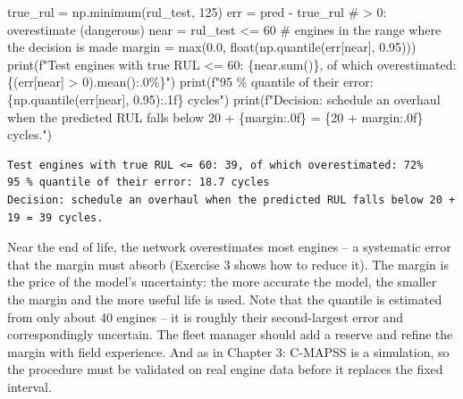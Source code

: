 \documentclass[
  letterpaper,
  DIV=11,
  numbers=noendperiod]{scrreprt}
\newenvironment{Shaded}{\begin{snugshade}}{\end{snugshade}}
\newcommand{\BuiltInTok}[1]{\textcolor[rgb]{0.00,0.23,0.31}{#1}}
\newcommand{\CommentTok}[1]{\textcolor[rgb]{0.37,0.37,0.37}{#1}}
\newcommand{\DecValTok}[1]{\textcolor[rgb]{0.68,0.00,0.00}{#1}}
\newcommand{\FloatTok}[1]{\textcolor[rgb]{0.68,0.00,0.00}{#1}}
\newcommand{\NormalTok}[1]{\textcolor[rgb]{0.00,0.23,0.31}{#1}}
\newcommand{\OperatorTok}[1]{\textcolor[rgb]{0.37,0.37,0.37}{#1}}
\newcommand{\SpecialCharTok}[1]{\textcolor[rgb]{0.37,0.37,0.37}{#1}}
\newcommand{\SpecialStringTok}[1]{\textcolor[rgb]{0.13,0.47,0.30}{#1}}
\begin{document}
\begin{Shaded}
\begin{Highlighting}[]
\NormalTok{true\_rul }\OperatorTok{=}\NormalTok{ np.minimum(rul\_test, }\DecValTok{125}\NormalTok{)}
\NormalTok{err }\OperatorTok{=}\NormalTok{ pred }\OperatorTok{{-}}\NormalTok{ true\_rul                                   }\CommentTok{\# \textgreater{} 0: overestimate (dangerous)}
\NormalTok{near }\OperatorTok{=}\NormalTok{ rul\_test }\OperatorTok{\textless{}=} \DecValTok{60}                                   \CommentTok{\# engines in the range where the decision is made}
\NormalTok{margin }\OperatorTok{=} \BuiltInTok{max}\NormalTok{(}\FloatTok{0.0}\NormalTok{, }\BuiltInTok{float}\NormalTok{(np.quantile(err[near], }\FloatTok{0.95}\NormalTok{)))}
\BuiltInTok{print}\NormalTok{(}\SpecialStringTok{f"Test engines with true RUL \textless{}= 60: }\SpecialCharTok{\{}\NormalTok{near}\SpecialCharTok{.}\BuiltInTok{sum}\NormalTok{()}\SpecialCharTok{\}}\SpecialStringTok{, of which overestimated: }\SpecialCharTok{\{}\NormalTok{(err[near] }\OperatorTok{\textgreater{}} \DecValTok{0}\NormalTok{)}\SpecialCharTok{.}\NormalTok{mean()}\SpecialCharTok{:.0\%\}}\SpecialStringTok{"}\NormalTok{)}
\BuiltInTok{print}\NormalTok{(}\SpecialStringTok{f"95 \% quantile of their error: }\SpecialCharTok{\{}\NormalTok{np}\SpecialCharTok{.}\NormalTok{quantile(err[near], }\FloatTok{0.95}\NormalTok{)}\SpecialCharTok{:.1f\}}\SpecialStringTok{ cycles"}\NormalTok{)}
\BuiltInTok{print}\NormalTok{(}\SpecialStringTok{f"Decision: schedule an overhaul when the predicted RUL falls below 20 + }\SpecialCharTok{\{}\NormalTok{margin}\SpecialCharTok{:.0f\}}\SpecialStringTok{ = }\SpecialCharTok{\{}\DecValTok{20} \OperatorTok{+}\NormalTok{ margin}\SpecialCharTok{:.0f\}}\SpecialStringTok{ cycles."}\NormalTok{)}
\end{Highlighting}
\end{Shaded}

\begin{verbatim}
Test engines with true RUL <= 60: 39, of which overestimated: 72%
95 % quantile of their error: 18.7 cycles
Decision: schedule an overhaul when the predicted RUL falls below 20 + 19 = 39 cycles.
\end{verbatim}

Near the end of life, the network overestimates most engines -- a
systematic error that the margin must absorb (Exercise 3 shows how to
reduce it). The margin is the price of the model's uncertainty: the more
accurate the model, the smaller the margin and the more useful life is
used. Note that the quantile is estimated from only about 40 engines --
it is roughly their second-largest error and correspondingly uncertain.
The fleet manager should add a reserve and refine the margin with field
experience. And as in Chapter 3: C-MAPSS is a simulation, so the
procedure must be validated on real engine data before it replaces the
fixed interval.
\end{document}
